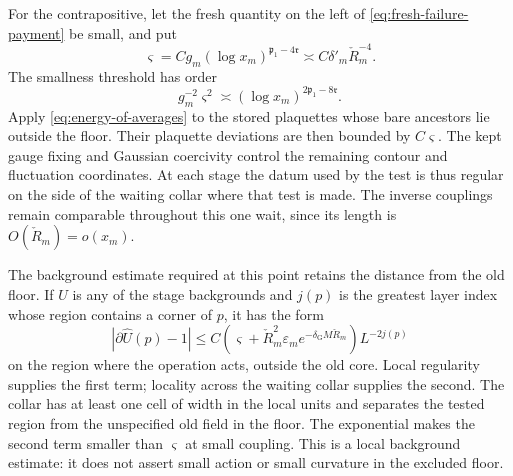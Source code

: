 \documentclass[11pt,letterpaper,reqno]{amsart}
\theoremstyle{definition}
\theoremstyle{remark}
\begin{document}
For the contrapositive, let the fresh quantity on the left of
\eqref{eq:fresh-failure-payment} be small, and put
\[
 \varsigma=Cg_m(\log x_m)^{\mathfrak p_1-4\mathfrak r}
                   \asymp C\delta'_m\check R_m^{-4}.
\]
The smallness threshold has order
\[
 g_m^{-2}\varsigma^2
                   \asymp(\log x_m)^{2\mathfrak p_1-8\mathfrak r}.
\]
Apply \eqref{eq:energy-of-averages} to the stored plaquettes whose
bare ancestors lie outside the floor. Their plaquette deviations
are then bounded by \(C\varsigma\). The kept gauge fixing and
Gaussian coercivity control the remaining contour and fluctuation
coordinates. At each stage the datum used by the test is thus
regular on the side of the waiting collar where that test is made.
The inverse couplings remain comparable throughout this one wait,
since its length is \(O(\check R_m)=o(x_m)\).

The background estimate required at this point retains the distance
from the old floor. If \(\hat U\) is any of the stage backgrounds
and \(j(p)\) is the greatest layer index whose region contains a
corner of \(p\), it has the form
\begin{equation}\label{eq:mass-stage-screening}
 |\partial\hat U(p)-1|
 \le C\left(\varsigma+\check R_m^2\varepsilon_m
                          e^{-\delta_{\mathrm G}M\check R_m}\right)
                              L^{-2j(p)}
\end{equation}
on the region where the operation acts, outside the old core.
Local regularity supplies the first term; locality across the
waiting collar supplies the second. The collar has at least one
cell of width in the local units and separates the tested region
from the unspecified old field in the floor.
The exponential makes the second term smaller than \(\varsigma\)
at small coupling. This is a local background estimate: it does
not assert small action or small curvature in the excluded floor.
\end{document}

